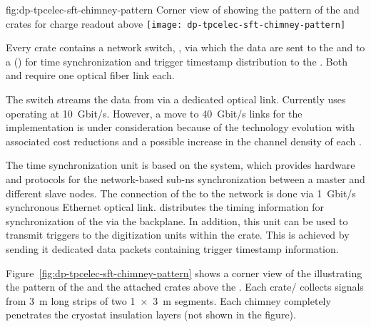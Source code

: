 \begin{dunefigure}{fig:dp-tpcelec-sft-chimney-pattern}
{Corner view of  showing the pattern of the  and  crates for charge readout above }
\texttt{[image: dp-tpcelec-sft-chimney-pattern]}
\end{dunefigure}

Every  crate contains a network switch, , via which the data are sent to the   and to a () for time synchronization and trigger timestamp distribution to the . Both  and  require one optical fiber link each. 

The  switch streams the data from  via a dedicated optical link. Currently  uses  operating at \SI{10}{Gbit/s}. However, a move to \SI{40}{Gbit/s} links for the  implementation is under consideration because of the technology evolution with associated cost reductions and a possible increase in the channel density of each .

The  time synchronization unit is based on the  system, which provides hardware and protocols for the network-based sub-\si{\nano\s} synchronization between a master and different slave nodes. The connection of the  to the  network is done via \SI{1}{Gbit/s} synchronous Ethernet optical link.  distributes the timing information for synchronization of the  via the  backplane. In addition, this unit can be used to transmit triggers to the digitization units within the crate. This is achieved by sending it dedicated data packets containing trigger timestamp information. 

Figure~\ref{fig:dp-tpcelec-sft-chimney-pattern} shows a corner view of the  illustrating the pattern of the  and the attached  crates above the . Each crate/ collects signals from \SI{3}{\meter} long strips of two \SI[product-units=power]{1x3}{\meter}  segments. Each chimney completely %
penetrates the cryostat insulation layers (not shown in the figure). 

